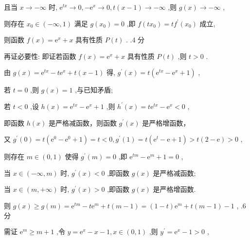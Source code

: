 \documentclass[10pt]{article}
\begin{document}
且当 \(x \rightarrow   - \infty\) 时, \({\mathrm{e}}^{tx} \rightarrow  0, - {\mathrm{e}}^{x} \rightarrow  0,t\left( {x - 1}\right)  \rightarrow   - \infty\) ,则 \(g\left( x\right)  \rightarrow   - \infty\) ,

则存在 \({x}_{0} \in  \left( {-\infty ,1}\right)\) 满足 \(g\left( {x}_{0}\right)  = 0\) ,即 \(f\left( {t{x}_{0}}\right)  = t{f}^{\prime }\left( {x}_{0}\right)\) 成立,

则函数 \(f\left( x\right)  = {\mathrm{e}}^{x} + x\) 具有性质 \(P\left( t\right)\) . .4 分

再证必要性: 即证若函数 \(f\left( x\right)  = {\mathrm{e}}^{x} + x\) 具有性质 \(P\left( t\right)\) ,则 \(t > 0\) .

由 \(g\left( x\right)  = {\mathrm{e}}^{tx} - t{\mathrm{e}}^{x} + t\left( {x - 1}\right)\) 得, \({g}^{\prime }\left( x\right)  = t\left( {{\mathrm{e}}^{tx} - {\mathrm{e}}^{x} + 1}\right)\) ,

若 \(t = 0\) ,则 \(g\left( x\right)  = 1\) ,与已知矛盾;

若 \(t < 0\) ,设 \(h\left( x\right)  = {\mathrm{e}}^{tx} - {\mathrm{e}}^{x} + 1\) ,则 \({h}^{\prime }\left( x\right)  = t{\mathrm{e}}^{tx} - {\mathrm{e}}^{x} < 0\) ,

即函数 \(h\left( x\right)\) 是严格减函数，则函数 \({g}^{\prime }\left( x\right)\) 是严格增函数，

又 \({g}^{\prime }\left( 0\right)  = t\left( {{\mathrm{e}}^{0} - {\mathrm{e}}^{0} + 1}\right)  = t < 0,{g}^{\prime }\left( 1\right)  = t\left( {{\mathrm{e}}^{t} - \mathrm{e} + 1}\right)  > t\left( {2 - \mathrm{e}}\right)  > 0\) ,

则存在 \(m \in  \left( {0,1}\right)\) 使得 \({g}^{\prime }\left( m\right)  = 0\) ,即 \({\mathrm{e}}^{tm} - {\mathrm{e}}^{m} + 1 = 0\) ,

当 \(x \in  \left( {-\infty ,m}\right)\) 时, \({g}^{\prime }\left( x\right)  < 0\) ,即函数 \(g\left( x\right)\) 是严格减函数;

当 \(x \in  \left( {m, + \infty }\right)\) 时, \({g}^{\prime }\left( x\right)  > 0\) ,即函数 \(g\left( x\right)\) 是严格增函数.

则 \(g\left( x\right)  \geq  g\left( m\right)  = {\mathrm{e}}^{tm} - t{\mathrm{e}}^{m} + t\left( {m - 1}\right)  = \left( {1 - t}\right) {\mathrm{e}}^{m} + t\left( {m - 1}\right)  - 1\) , .6 分

需证 \({\mathrm{e}}^{m} \geq  m + 1\) ,令 \(y = {\mathrm{e}}^{x} - x - 1,x \in  \left( {0,1}\right)\) ,则 \({y}^{\prime } = {\mathrm{e}}^{x} - 1 > 0\) ,
\end{document}
